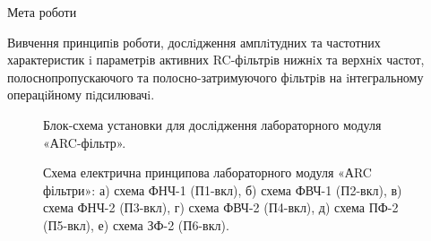 \documentclass[a4paper,14pt]{extreport}
\begin{document}
\begin{center}Мета роботи\end{center}\par
Вивчення принципiв роботи, дослiдження амплiтудних та частотних характеристик i параметрiв активних RC-фiльтрiв нижнiх та верхнiх частот, полоснопропускаючого та полосно-затримуючого фiльтрiв на iнтегральному операцiйному пiдсилювачi.

\begin{figure}[h]
	\caption{ Блок-схема установки для дослідження лабораторного модуля «АRC-фільтр».}
\end{figure}\par

\begin{landscape}
	\begin{figure}[h]
		\caption{Схема електрична принципова лабораторного модуля «АRC фільтри»: а) схема ФНЧ-1 (П1-вкл), б) схема ФВЧ-1 (П2-вкл), в) схема ФНЧ-2 (П3-вкл), г) схема ФВЧ-2 (П4-вкл), д) схема ПФ-2 (П5-вкл), е) схема ЗФ-2 (П6-вкл).}
	\end{figure}
\end{landscape}
\end{document}
